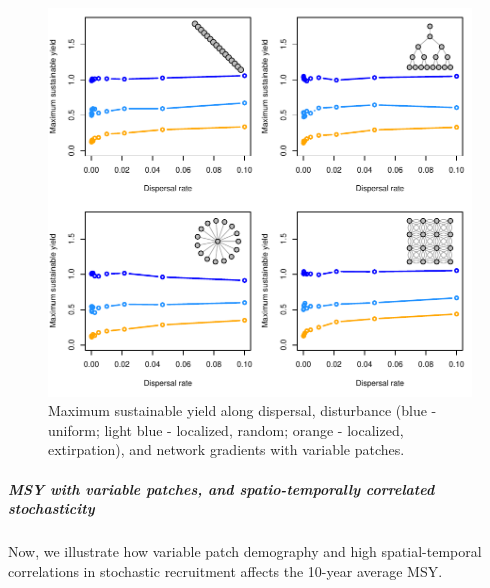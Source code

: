 \documentclass[]{article}
\let\oldsubparagraph\subparagraph
\renewcommand{\subparagraph}[1]{\oldsubparagraph{#1}\mbox{}}
\begin{document}
\begin{figure}[H]

{\centering \includegraphics{Managing_for_ecological_surprises_in_metapopulations_makeHTML_files/figure-latex/MSY with variable patches and stochasticity-1} 

}

\caption{Maximum sustainable yield along dispersal, disturbance (blue - uniform; light blue - localized, random; orange - localized, extirpation), and network gradients with variable patches.}\label{fig:MSY with variable patches and stochasticity}
\end{figure}

\hypertarget{msy-with-variable-patches-and-spatio-temporally-correlated-stochasticity}{%
\subparagraph{MSY with variable patches, and spatio-temporally
correlated
stochasticity}\label{msy-with-variable-patches-and-spatio-temporally-correlated-stochasticity}}

Now, we illustrate how variable patch demography and high
spatial-temporal correlations in stochastic recruitment affects the
10-year average MSY.
\end{document}

